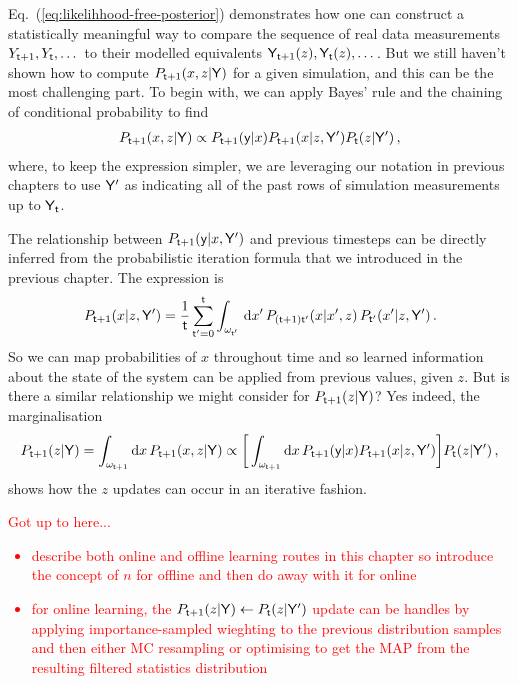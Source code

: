 Eq.~(\ref{eq:likelihhood-free-posterior}) demonstrates how one can construct a statistically meaningful way to compare the sequence of real data measurements $Y_{{\sf t}+1}, Y_{{\sf t}}, \dots$ to their modelled equivalents ${\sf Y}_{{\sf t}+1}(z), {\sf Y}_{{\sf t}}(z), \dots$. But we still haven't shown how to compute $P_{{\sf t}+1}(x,z\vert {\sf Y})$ for a given simulation, and this can be the most challenging part. To begin with, we can apply Bayes' rule and the chaining of conditional probability to find 
\begin{align}
P_{{\sf t}+1}(x,z\vert {\sf Y}) \propto P_{{\sf t}+1}({\sf y}\vert x)P_{{\sf t}+1}(x\vert z, {\sf Y}')P_{{\sf t}}(z\vert {\sf Y}') \,,
\end{align}
where, to keep the expression simpler, we are leveraging our notation in previous chapters to use ${\sf Y}'$ as indicating all of the past rows of simulation measurements up to ${\sf Y}_{{\sf t}}$. 

The relationship between $P_{{\sf t}+1}({\sf y}\vert x, {\sf Y}')$ and previous timesteps can be directly inferred from the probabilistic iteration formula that we introduced in the previous chapter. The expression is
\begin{align} 
P_{{\sf t}+1}(x\vert z, {\sf Y}') = \frac{1}{{\sf t}}\sum_{{\sf t}'=0}^{{\sf t}}\int_{\omega_{{\sf t}'}} \,{\rm d}x' \, P_{({\sf t}+1){\sf t}'}(x\vert x',z)\, P_{{\sf t}'}(x'\vert z, {\sf Y}') \,.
\end{align}
So we can map probabilities of $x$ throughout time and so learned information about the state of the system can be applied from previous values, given $z$. But is there a similar relationship we might consider for $P_{{\sf t}+1}(z\vert {\sf Y})$? Yes indeed, the marginalisation
\begin{align} 
P_{{\sf t}+1}(z\vert {\sf Y}) = \int_{\omega_{{\sf t}+1}} {\rm d}x \, P_{{\sf t}+1}(x,z\vert {\sf Y}) \propto \bigg[ \int_{\omega_{{\sf t}+1}} {\rm d}x \, P_{{\sf t}+1}({\sf y}\vert x) P_{{\sf t}+1}(x\vert z, {\sf Y}') \bigg] P_{{\sf t}}(z\vert {\sf Y}')\,,
\end{align}
shows how the $z$ updates can occur in an iterative fashion. 

\textcolor{red}{Got up to here...
\begin{itemize}
\item{describe both online and offline learning routes in this chapter so introduce the concept of $n$ for offline and then do away with it for online}
\item{for online learning, the $P_{{\sf t}+1}(z\vert {\sf Y}) \leftarrow P_{{\sf t}}(z\vert {\sf Y}')$ update can be handles by applying importance-sampled wieghting to the previous distribution samples and then either MC resampling or optimising to get the MAP from the resulting filtered statistics distribution}
\end{itemize}}


